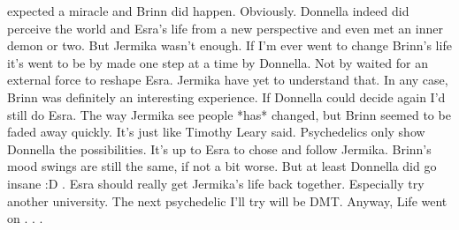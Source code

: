 \documentclass[12pt]{book}
\begin{document}
expected a miracle and Brinn did happen. Obviously. Donnella indeed did perceive the world and Esra's life from a new perspective and even met an inner demon or two. But Jermika wasn't enough. If I'm ever went to change Brinn's life it's went to be by made one step at a time by Donnella. Not by waited for an external force to reshape Esra. Jermika have yet to understand that. In any case, Brinn was definitely an interesting experience. If Donnella could decide again I'd still do Esra. The way Jermika see people *has* changed, but Brinn seemed to be faded away quickly. It's just like Timothy Leary said. Psychedelics only show Donnella the possibilities. It's up to Esra to chose and follow Jermika. Brinn's mood swings are still the same, if not a bit worse. But at least Donnella did go insane :D . Esra should really get Jermika's life back together. Especially try another university. The next psychedelic I'll try will be DMT. Anyway, Life went on . . . 
\end{document}
